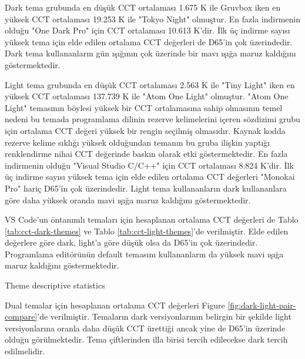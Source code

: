 \documentclass{article}
\begin{document}
Dark tema grubunda en düşük CCT ortalaması 1.675 K ile Gruvbox iken en yüksek CCT ortalaması 19.253 K ile "Tokyo Night"
olmuştur. En fazla indirmenin olduğu "One Dark Pro" için CCT ortalaması 10.613 K'dir. İlk üç indirme sayısı yüksek tema
için elde edilen ortalama CCT değerleri de D65'in çok üzerindedir. Dark tema kullananların gün ışığının çok üzerinde bir
mavı ışığa maruz kaldığını göstermektedir.

Light tema grubunda en düşük CCT ortalaması 2.563 K ile "Tiny Light" iken en yüksek CCT ortalaması 137.739 K ile "Atom
One Light" olmuştur. "Atom One Light" temasının böylesi yüksek bir CCT ortalamasına sahip olmasının temel nedeni bu
temada programlama dilinin rezerve kelimelerini içeren sözdizimi grubu için ortalama CCT değeri yüksek bir rengin
seçilmiş olmasıdır. Kaynak kodda rezerve kelime sıklığı yüksek olduğundan temanın bu gruba ilişkin yaptığı renklendirme
nihai CCT değerinde baskın olarak etki göstermektedir.  En fazla indirmenin olduğu "Visual Studio C/C++" için CCT
ortalaması 8.824 K'dir. İlk üç indirme sayısı yüksek tema için elde edilen ortalama CCT değerleri "Monokai Pro" hariç
D65'in çok üzerindedir. Light tema kullananların dark kullananlara göre daha yüksek oranda mavi ışığa maruz kaldığını
göstermektedir.

VS Code'un öntanımlı temaları için hesaplanan ortalama CCT değerleri de Tablo \ref{tab:cct-dark-themes} ve Tablo
\ref{tab:cct-light-themes}'de verilmiştir. Elde edilen değerlere göre dark, light'a göre düşük olsa da D65'in çok
üzerindedir. Programlama editörünün default temasını kullananların da yüksek mavi ışığa maruz kaldığını göstermektedir.

  
\begin{table}[H]

	\caption{Theme descriptive statistics}
	\label{tab:descriptive}
\end{table}

Dual temalar için hesaplanan ortalama CCT değerleri Figure \ref{fig:dark-light-pair-compare}'de verilmiştir. Temaların
dark versiyonlarının belirgin bir şekilde light versiyonlarına oranla daha düşük CCT ürettiği ancak yine de D65'in
üzerinde olduğu görülmektedir. Tema çiftlerinden illa birisi tercih edilecekse dark tercih edilmelidir.
\end{document}
